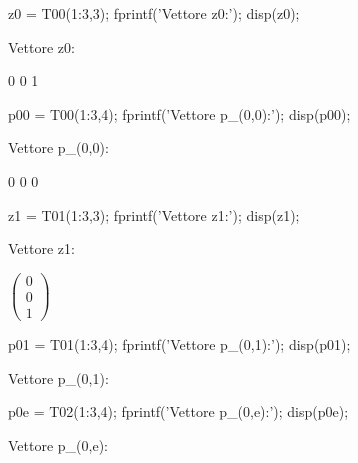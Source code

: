 \documentclass[11pt, a4paper]{article}
\begin{document}
\begin{matlabcode}
z0 = T00(1:3,3);
fprintf('Vettore z0:');
disp(z0);
\end{matlabcode}
\begin{matlaboutput}
Vettore z0:
\end{matlaboutput}
\begin{matlaboutput}
     0
     0
     1
\end{matlaboutput}
\begin{matlabcode}

p00 = T00(1:3,4);
fprintf('Vettore p_(0,0):');
disp(p00);
\end{matlabcode}
\begin{matlaboutput}
Vettore p_(0,0):
\end{matlaboutput}
\begin{matlaboutput}
     0
     0
     0
\end{matlaboutput}
\begin{matlabcode}

z1 = T01(1:3,3);
fprintf('Vettore z1:');
disp(z1);
\end{matlabcode}
\begin{matlaboutput}
Vettore z1:
\end{matlaboutput}
\begin{matlabsymbolicoutput}
$
\begin{pmatrix}
    0\\
    0\\
    1
\end{pmatrix}
$
\end{matlabsymbolicoutput}
\newpage
\begin{matlabcode}
p01 = T01(1:3,4);
fprintf('Vettore p_(0,1):');
disp(p01);
\end{matlabcode}
\begin{matlaboutput}
Vettore p_(0,1):
\end{matlaboutput}
\begin{matlabcode}
p0e = T02(1:3,4);
fprintf('Vettore p_(0,e):');
disp(p0e);
\end{matlabcode}
\begin{matlaboutput}
Vettore p_(0,e):
\end{matlaboutput}
\end{document}
